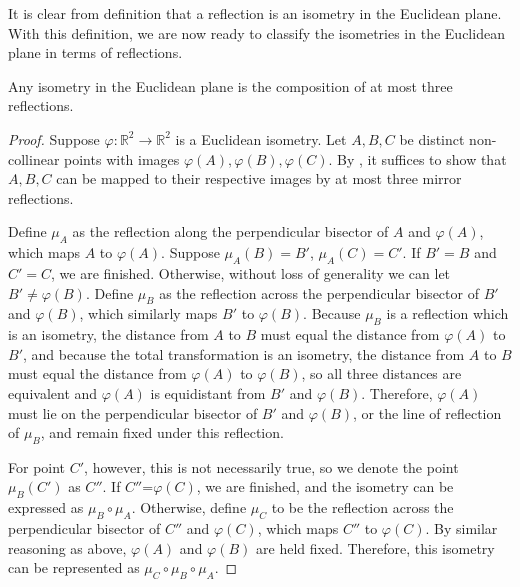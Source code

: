 \documentclass{mystyle}
\begin{document}
It is clear from definition that a reflection is an isometry in the Euclidean plane. With this definition, we are now ready to classify the isometries in the Euclidean plane in terms of reflections. 
\begin{theorem}\label{thm_euclidean_isometry}
    Any isometry in the Euclidean plane is the composition of at most three reflections.
\end{theorem}
\begin{proof}
Suppose $\varphi: \mathbb{R}^2 \to \mathbb{R}^2$ is a Euclidean isometry. Let $A, B, C$ be distinct non-collinear points with images $\varphi(A), \varphi(B), \varphi(C)$. By , it suffices to show that $A, B, C$ can be mapped to their respective images by at most three mirror reflections. 

Define $\mu_A$ as the reflection along the perpendicular bisector of $A$ and $\varphi(A)$, which maps $A$ to $\varphi(A)$. Suppose $\mu_A(B) = B'$, $\mu_A(C) = C'$. If $B'= B$ and $C'=C$, we are finished. Otherwise, without loss of generality we can let $B' \ne \varphi(B)$. Define $\mu_B$ as the reflection across the perpendicular bisector of $B'$ and $\varphi(B)$, which similarly maps $B'$ to $\varphi(B)$. Because $\mu_B$ is a reflection which is an isometry, the distance from $A$ to $B$ must equal the distance from $\varphi(A)$ to $B'$, and because the total transformation is an isometry, the distance from $A$ to $B$ must equal the distance from $\varphi(A)$ to $\varphi(B)$, so all three distances are equivalent and $\varphi(A)$ is equidistant from $B'$ and $\varphi(B)$. Therefore, $\varphi(A)$ must lie on the perpendicular bisector of $B'$ and $\varphi(B)$, or the line of reflection of $\mu_B$, and remain fixed under this reflection. 

For point $C'$, however, this is not necessarily true, so we denote the point $\mu_B(C')$ as $C''$. If $C''$=$\varphi(C)$, we are finished, and the isometry can be expressed as $\mu_B \circ \mu_A$. Otherwise, define $\mu_C$ to be the reflection across the perpendicular bisector of $C''$ and $\varphi(C)$, which maps $C''$ to $\varphi(C)$. By similar reasoning as above, $\varphi(A)$ and $\varphi(B)$ are held fixed. Therefore, this isometry can be represented as $\mu_C \circ \mu_B \circ \mu_A$.
\end{proof}
\end{document}
